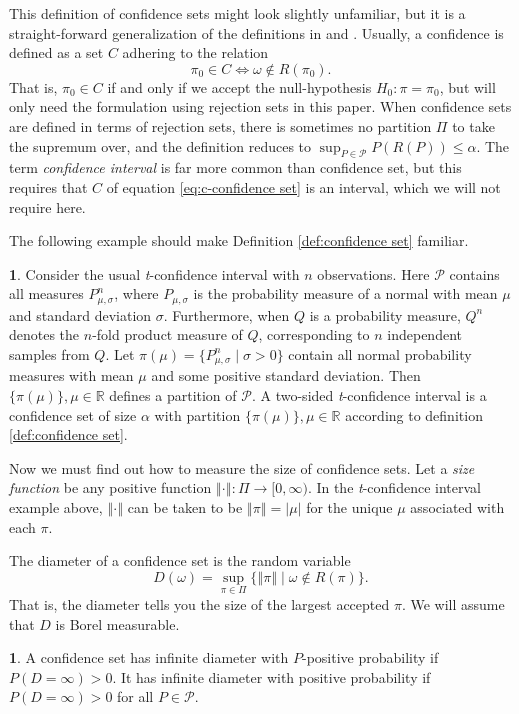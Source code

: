 \documentclass[article]{ajs}
\numberwithin{equation}{section}
\numberwithin{figure}{section}
\theoremstyle{plain}
\theoremstyle{definition}
\newtheorem{defn}[thm]{\protect\definitionname}
\theoremstyle{definition}
\newtheorem{example}[thm]{\protect\examplename}
\theoremstyle{plain}
\providecommand{\definitionname}{Definition}
\providecommand{\examplename}{Example}
\begin{document}
This definition of confidence sets might look slightly unfamiliar,
but it is a straight-forward generalization of the definitions in
\citet[Definition 9.1.5]{Casella2002-lg} and \citet[Section 3.5]{lehmann2006testing}.
Usually, a confidence is defined as a set $C$ adhering to the relation
\begin{equation}
\pi_{0}\in C\iff\omega\notin R(\pi_{0}).\label{eq:c-confidence set}
\end{equation}
That is, $\pi_{0}\in C$ if and only if we accept the null-hypothesis
$H_{0}:\pi=\pi_{0}$, but will only need the formulation using rejection
sets in this paper. When confidence sets are defined in terms of rejection
sets, there is sometimes no partition $\Pi$ to take the supremum
over, and the definition reduces to $\sup_{P\in\mathcal{P}}P(R(P))\leq\alpha$.
The term\emph{ confidence interval} is far more common than confidence
set, but this requires that $C$ of equation \ref{eq:c-confidence set}
is an interval, which we will not require here.

The following example should make Definition \ref{def:confidence set}
familiar.
\begin{example}
\label{exa:t-test} Consider the usual \emph{t}-confidence interval
with $n$ observations. Here $\mathcal{P}$ contains all measures
$P_{\mu,\sigma}^{n}$, where $P_{\mu,\sigma}$ is the probability
measure of a normal with mean $\mu$ and standard deviation $\sigma$.
Furthermore, when $Q$ is a probability measure, $Q^{n}$ denotes
the $n$-fold product measure of $Q$, corresponding to $n$ independent
samples from $Q$. Let $\pi(\mu)=\{P_{\mu,\sigma}^{n}\mid\sigma>0\}$
contain all normal probability measures with mean $\mu$ and some
positive standard deviation. Then $\{\pi(\mu)\},\mu\in\mathbb{R}$
defines a partition of $\mathcal{P}$. A two-sided \emph{t}-confidence
interval is a confidence set of size $\alpha$ with partition $\{\pi(\mu)\},\mu\in\mathbb{R}$
according to definition \ref{def:confidence set}.
\end{example}

Now we must find out how to measure the size of confidence sets. Let
a \emph{size function} be any positive function $\left\Vert \cdot\right\Vert :\Pi\to[0,\infty)$.
In the \emph{t}-confidence interval example above, $\left\Vert \cdot\right\Vert $
can be taken to be $\left\Vert \pi\right\Vert =|\mu|$ for the unique
$\mu$ associated with each $\pi$. 

The diameter of a confidence set is the random variable
\begin{equation}
D(\omega)=\sup_{\pi\in\Pi}\{\left\Vert \pi\right\Vert \mid\omega\notin R(\pi)\}.\label{eq:diameter}
\end{equation}
That is, the diameter tells you the size of the largest accepted $\pi$.
We will assume that $D$ is Borel measurable.
\begin{defn}
\label{def:infinite diameter}A confidence set has infinite diameter
with $P$-positive probability if $P(D=\infty)>0$. It has infinite
diameter with positive probability if $P(D=\infty)>0$ for all $P\in\mathcal{P}$.
\end{defn}
\end{document}
